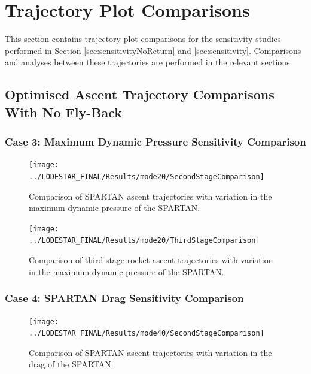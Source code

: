 		
		\chapter{Trajectory Plot Comparisons}\label{sec:Appendix_trajectorycomparisons}
		
This section contains trajectory plot comparisons for the sensitivity studies performed in Section \ref{sec:sensitivityNoReturn} and \ref{sec:sensitivity}. Comparisons and analyses between these trajectories are performed in the relevant sections. 
		\clearpage
		\section{Optimised Ascent Trajectory Comparisons With No Fly-Back}
		
		\subsection{Case 3: Maximum Dynamic Pressure Sensitivity Comparison}\label{sec:app_comparison20}
		
		
\begin{figure}[!ht]
\centering
\texttt{[image: ../LODESTAR\_FINAL/Results/mode20/SecondStageComparison]}
\caption{Comparison of SPARTAN ascent trajectories with variation in the maximum dynamic pressure of the SPARTAN.}
\label{fig:SecondStageComparison1}
\end{figure}

\begin{figure}[!th]
\centering
\texttt{[image: ../LODESTAR\_FINAL/Results/mode20/ThirdStageComparison]}
\caption{Comparison of third stage rocket ascent trajectories with variation in the maximum dynamic pressure of the SPARTAN.}
\label{fig:ThirdStageComparison1}
\end{figure}
\FloatBarrier

\clearpage

\subsection{Case 4: SPARTAN Drag Sensitivity Comparison}\label{sec:app_comparison40}

\begin{figure}[!th]
\centering
\texttt{[image: ../LODESTAR\_FINAL/Results/mode40/SecondStageComparison]}
\caption{Comparison of SPARTAN ascent trajectories with variation in the drag of the SPARTAN.}
\label{fig:SecondStageComparison3}
\end{figure}

